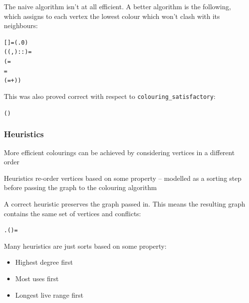 \documentclass{beamer}
\begin{document}
\begin{frame}[containsverbatim]
The naive algorithm isn't at all efficient. A better algorithm is the following, which assigns to each vertex the lowest colour which won't clash with its neighbours:

\begin{alltt}\small
	 = (\HOLTokenLambda{}. 0)
 ((,)::) =
(  =   
   =   
   ( =+ ) )
\end{alltt}

This was also proved correct with respect to \texttt{colouring\_satisfactory}:

\begin{alltt}\small
	\HOLTokenTurnstile{}   \HOLTokenConj{}   \HOLTokenConj{}
     \HOLTokenImp{}
    ( ) 
\end{alltt}
\end{frame}

\begin{frame}[containsverbatim]
\frametitle{Heuristics}
More efficient colourings can be achieved by considering vertices in a different order

Heuristics re-order vertices based on some property -- modelled as a sorting step before passing the graph to the colouring algorithm

A correct heuristic preserves the graph passed in. This means the resulting graph contains the same set of vertices and conflicts:

\begin{alltt}\small
	  \HOLTokenEquiv{} \HOLTokenForall{}.  ( ) =  
\end{alltt}

Many heuristics are just sorts based on some property:

\begin{itemize}
	\item Highest degree first
	\item Most uses first
	\item Longest live range first
\end{itemize}
\end{frame}
\end{document}
